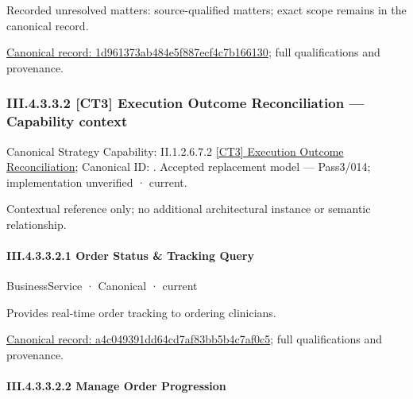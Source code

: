 {\small Recorded unresolved matters: source-qualified matters; exact scope remains in the canonical record.}\par
{\footnotesize \href{../../../../../../../../continuum/business/business-service/1d961373ab484e5f887ecf4c7b166130.md}{Canonical record: 1d961373ab484e5f887ecf4c7b166130}; full qualifications and provenance.}\par
\subsubsection*{III.4.3.3.2 [CT3] Execution Outcome Reconciliation — Capability context}
\label{navigation:III.4.3.3.2}

{\small Canonical Strategy Capability: II.1.2.6.7.2 \hyperref[element:383de8b703bb448b96cf2ac9c31c90c5]{[CT3] Execution Outcome Reconciliation}; Canonical ID: \texttt{}. Accepted replacement model — Pass3/014; implementation unverified · current.}\par
Contextual reference only; no additional architectural instance or semantic relationship.\par
\paragraph*{III.4.3.3.2.1 Order Status \& Tracking Query}
\label{navigation:III.4.3.3.2.1}

\label{element:a4c049391dd64cd7af83bb5b4c7af0c5}
{\small BusinessService · Canonical · current}\par

Provides real-time order tracking to ordering clinicians.


{\footnotesize \href{../../../../../../../../continuum/business/business-service/a4c049391dd64cd7af83bb5b4c7af0c5.md}{Canonical record: a4c049391dd64cd7af83bb5b4c7af0c5}; full qualifications and provenance.}\par
\paragraph*{III.4.3.3.2.2 Manage Order Progression}
\label{navigation:III.4.3.3.2.2}

